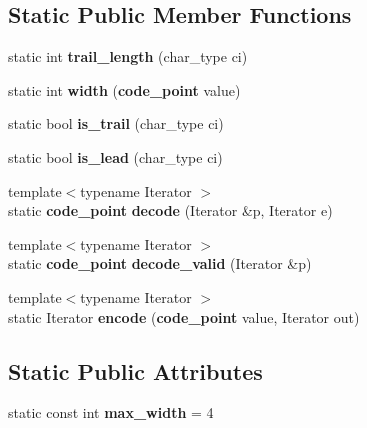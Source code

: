 \subsection*{\-Static \-Public \-Member \-Functions}
\begin{DoxyCompactItemize}
\item 
static int {\bfseries trail\-\_\-length} (char\-\_\-type ci)\label{structbooster_1_1locale_1_1utf_1_1utf__traits_3_01CharType_00_011_01_4_a201813f53f743fd2328cc4bd2b3f3f83}

\item 
static int {\bfseries width} ({\bf code\-\_\-point} value)\label{structbooster_1_1locale_1_1utf_1_1utf__traits_3_01CharType_00_011_01_4_a932c4075e8acc4fe889d12a84eae0dfb}

\item 
static bool {\bfseries is\-\_\-trail} (char\-\_\-type ci)\label{structbooster_1_1locale_1_1utf_1_1utf__traits_3_01CharType_00_011_01_4_ae50437a7bf1273f744ae85b3f78353e9}

\item 
static bool {\bfseries is\-\_\-lead} (char\-\_\-type ci)\label{structbooster_1_1locale_1_1utf_1_1utf__traits_3_01CharType_00_011_01_4_abefe6df4cc063ebc388c121d039eb64c}

\item 
{\footnotesize template$<$typename Iterator $>$ }\\static {\bf code\-\_\-point} {\bfseries decode} (\-Iterator \&p, \-Iterator e)\label{structbooster_1_1locale_1_1utf_1_1utf__traits_3_01CharType_00_011_01_4_a0c3d27f2eac62e5377df448b37eea908}

\item 
{\footnotesize template$<$typename Iterator $>$ }\\static {\bf code\-\_\-point} {\bfseries decode\-\_\-valid} (\-Iterator \&p)\label{structbooster_1_1locale_1_1utf_1_1utf__traits_3_01CharType_00_011_01_4_a6c9a0f41197269ce0eb0ddc05ff925de}

\item 
{\footnotesize template$<$typename Iterator $>$ }\\static \-Iterator {\bfseries encode} ({\bf code\-\_\-point} value, \-Iterator out)\label{structbooster_1_1locale_1_1utf_1_1utf__traits_3_01CharType_00_011_01_4_a0e9c5ad8639e94da1a3e28cc867c9cce}

\end{DoxyCompactItemize}
\subsection*{\-Static \-Public \-Attributes}
\begin{DoxyCompactItemize}
\item 
static const int {\bfseries max\-\_\-width} = 4\label{structbooster_1_1locale_1_1utf_1_1utf__traits_3_01CharType_00_011_01_4_a1652d965a19800f3e0628eddd62bcb7d}

\end{DoxyCompactItemize}
